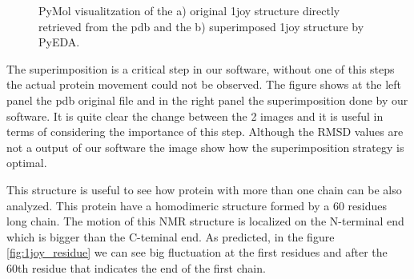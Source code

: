 \documentclass[12pt]{article}
\begin{document}
\begin{figure}[h]
  \centering
  \hfill
  \caption{PyMol\citep{PyMOL} visualitzation of the a) original 1joy structure directly retrieved from the pdb and the b) superimposed 1joy structure by PyEDA.}
\end{figure}

The superimposition is a critical step in our software, without one of this steps the actual protein movement could not be observed. The figure  shows at the left panel the pdb original file and in the right panel the superimposition done by our software. It is quite clear the change between the 2 images and it is useful in terms of considering the importance of this step. Although the RMSD values are not a output of our software the image show how the superimposition strategy is optimal. 

This structure is useful to see how protein with more than one chain can be also analyzed. This protein have a homodimeric structure formed by a 60 residues long  chain. The motion of this NMR structure is localized on the N-terminal end which is bigger than the C-teminal end. As predicted, in the figure \ref{fig:1joy_residue} we can see big fluctuation at the first residues and after the 60th residue that indicates the end of the first chain. 
\end{document}
